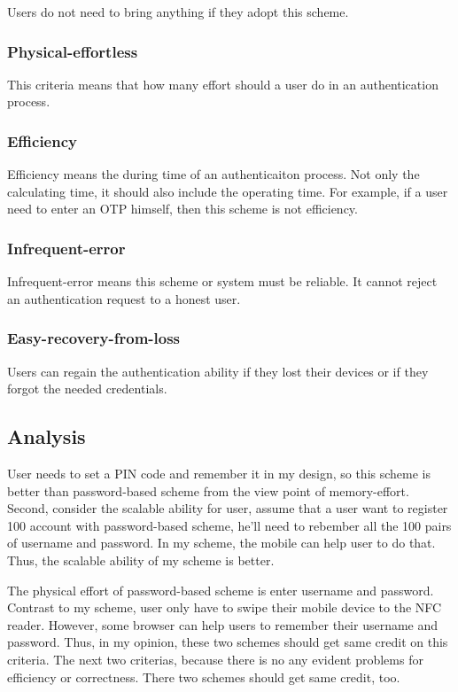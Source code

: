 \begin{CJK}{Bg5}{bsmi}
Users do not need to bring anything if they adopt this scheme.

\subsubsection{Physical-effortless}

This criteria means that how many effort should a user do in an authentication process.

\subsubsection{Efficiency}

Efficiency means the during time of an authenticaiton process. Not only the calculating time, it should also include the operating time. For example, if a user need to enter an OTP himself, then this scheme is not efficiency.

\subsubsection{Infrequent-error}

Infrequent-error means this scheme or system must be reliable. It cannot reject an authentication request to a honest user.

\subsubsection{Easy-recovery-from-loss}

Users can regain the authentication ability if they lost their devices or if they forgot the needed credentials.

\subsection{Analysis}

User needs to set a PIN code and remember it in my design, so this scheme is better than password-based scheme from the view point of memory-effort. Second, consider the scalable ability for user, assume that a user want to register 100 account with password-based scheme, he'll need to rebember all the 100 pairs of username and password. In my scheme, the mobile can help user to do that. Thus, the scalable ability of my scheme is better.

The physical effort of password-based scheme is enter username and password. Contrast to my scheme, user only have to swipe their mobile device to the NFC reader. However, some browser can help users to remember their username and password. Thus, in my opinion, these two schemes should get same credit on this criteria. The next two criterias, because there is no any evident problems for efficiency or correctness. There two schemes should get same credit, too.


\end{CJK}
